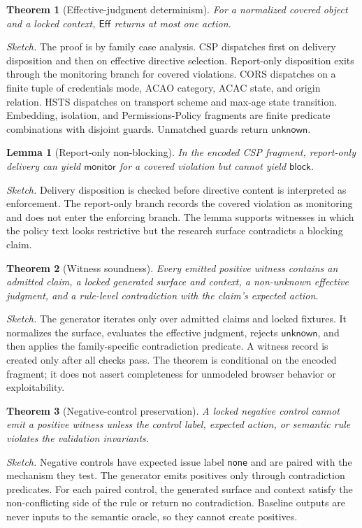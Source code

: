 \documentclass[10pt,conference]{IEEEtran}
\newtheorem{theorem}{Theorem}
\newtheorem{lemma}{Lemma}
\newcommand{\unknown}{\ensuremath{\mathsf{unknown}}}
\newcommand{\block}{\ensuremath{\mathsf{block}}}
\newcommand{\monitor}{\ensuremath{\mathsf{monitor}}}
\newcommand{\Eff}{\ensuremath{\mathsf{Eff}}}
\begin{document}
\begin{theorem}[Effective-judgment determinism]
For a normalized covered object and a locked context, $\Eff$ returns at most one action.
\end{theorem}
\emph{Sketch.} The proof is by family case analysis. CSP dispatches first on delivery disposition and then on effective directive selection. Report-only disposition exits through the monitoring branch for covered violations. CORS dispatches on a finite tuple of credentials mode, ACAO category, ACAC state, and origin relation. HSTS dispatches on transport scheme and max-age state transition. Embedding, isolation, and Permissions-Policy fragments are finite predicate combinations with disjoint guards. Unmatched guards return \unknown{}.

\begin{lemma}[Report-only non-blocking]
In the encoded CSP fragment, report-only delivery can yield \monitor{} for a covered violation but cannot yield \block{}.
\end{lemma}
\emph{Sketch.} Delivery disposition is checked before directive content is interpreted as enforcement. The report-only branch records the covered violation as monitoring and does not enter the enforcing branch. The lemma supports witnesses in which the policy text looks restrictive but the research surface contradicts a blocking claim.

\begin{theorem}[Witness soundness]
Every emitted positive witness contains an admitted claim, a locked generated surface and context, a non-unknown effective judgment, and a rule-level contradiction with the claim's expected action.
\end{theorem}
\emph{Sketch.} The generator iterates only over admitted claims and locked fixtures. It normalizes the surface, evaluates the effective judgment, rejects \unknown{}, and then applies the family-specific contradiction predicate. A witness record is created only after all checks pass. The theorem is conditional on the encoded fragment; it does not assert completeness for unmodeled browser behavior or exploitability.

\begin{theorem}[Negative-control preservation]
A locked negative control cannot emit a positive witness unless the control label, expected action, or semantic rule violates the validation invariants.
\end{theorem}
\emph{Sketch.} Negative controls have expected issue label \texttt{none} and are paired with the mechanism they test. The generator emits positives only through contradiction predicates. For each paired control, the generated surface and context satisfy the non-conflicting side of the rule or return no contradiction. Baseline outputs are never inputs to the semantic oracle, so they cannot create positives.
\end{document}
